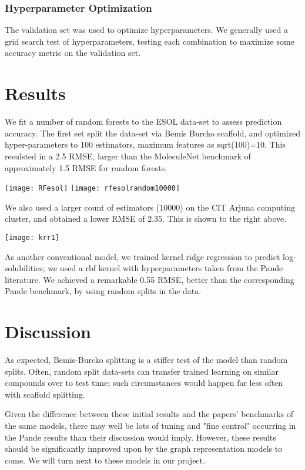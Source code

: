 \documentclass{article}
\begin{document}
\subsubsection{Hyperparameter Optimization}

The validation set was used to optimize hyperparameters. We generally used a grid search test of hyperparameters, testing each combination to maximize some accuracy metric on the validation set.

\section{Results}

We fit a number of random forests to the ESOL data-set to assess prediction accuracy. The first set split the data-set via Bemis Burcko scaffold, and optimized hyper-parameters to 100 estimators, maximum features as sqrt(100)=10. This resulsted in a 2.5 RMSE, larger than the MoleculeNet benchmark of approximately 1.5 RMSE for random forests.

\texttt{[image: RFesol]}
\texttt{[image: rfesolrandom10000]}

We also used a larger count of estimators (10000) on the CIT Arjuna computing cluster, and obtained a lower RMSE of 2.35. This is shown to the right above.

\texttt{[image: krr1]}

As another conventional model, we trained kernel ridge regression to predict log-solubilities; we used a rbf kernel with hyperparameters taken from the Pande literature. We achieved a remarkable 0.55 RMSE, better than the corresponding Pande benchmark, by using random splits in the data.

\section{Discussion}

As expected, Bemis-Burcko splitting is a stiffer test of the model than random splits. Often, random split data-sets can transfer trained learning on similar compounds over to test time; such circumstances would happen far less often with scaffold splitting.

Given the difference between these initial results and the papers' benchmarks of the same models, there may well be lots of tuning and "fine control" occurring in the Pande results than their discussion would imply. However, these results should be significantly improved upon by the graph representation models to come. We will turn next to these models in our project.
\end{document}
